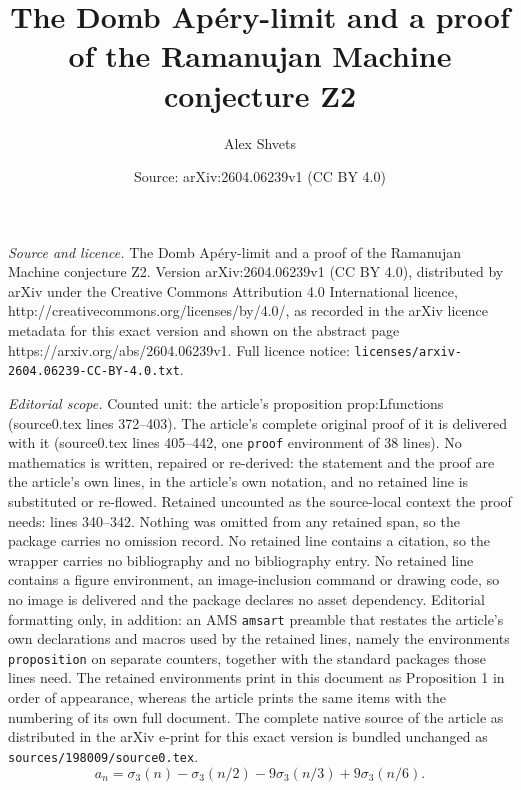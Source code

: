 \documentclass[10pt,a4paper]{amsart}
\title{The Domb Apéry-limit and a proof of the Ramanujan Machine conjecture Z2}
\author{Alex Shvets}
\date{Source: arXiv:2604.06239v1 (CC BY 4.0)}
\newcommand{\sigthree}{\sigma_3}
\begin{document}
\maketitle

\noindent\emph{Source and licence.} The Domb Apéry-limit and a proof of the Ramanujan Machine conjecture Z2. Version arXiv:2604.06239v1 (CC BY 4.0), distributed by arXiv under the Creative Commons Attribution 4.0 International licence, http://creativecommons.org/licenses/by/4.0/, as recorded in the arXiv licence metadata for this exact version and shown on the abstract page https://arxiv.org/abs/2604.06239v1. Full licence notice: \texttt{licenses/arxiv-2604.06239-CC-BY-4.0.txt}.\par\smallskip

\noindent\textit{Editorial scope.} Counted unit: the article's proposition prop:Lfunctions (source0.tex lines 372--403). The article's complete original proof of it is delivered with it (source0.tex lines 405--442, one \texttt{proof} environment of 38 lines). No mathematics is written, repaired or re-derived: the statement and the proof are the article's own lines, in the article's own notation, and no retained line is substituted or re-flowed.  Retained uncounted as the source-local context the proof needs: lines 340--342.  Nothing was omitted from any retained span, so the package carries no omission record.  No retained line contains a citation, so the wrapper carries no bibliography and no bibliography entry.  No retained line contains a figure environment, an image-inclusion command or drawing code, so no image is delivered and the package declares no asset dependency.  Editorial formatting only, in addition: an AMS \texttt{amsart} preamble that restates the article's own declarations and macros used by the retained lines, namely the environments \texttt{proposition} on separate counters, together with the standard packages those lines need.  The retained environments print in this document as Proposition 1 in order of appearance, whereas the article prints the same items with the numbering of its own full document.  The complete native source of the article as distributed in the arXiv e-print for this exact version is bundled unchanged as \texttt{sources/198009/source0.tex}.
\begin{equation}\label{eq:a-n-def}
a_n=\sigthree(n)-\sigthree(n/2)-9\sigthree(n/3)+9\sigthree(n/6).
\end{equation}
\end{document}
